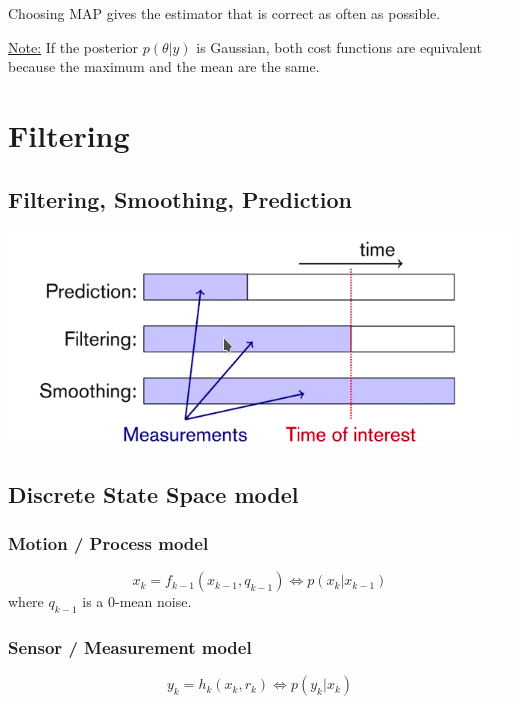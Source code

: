 Choosing MAP gives the estimator that is correct as often as possible.


\underline{Note:} If the posterior $p(\theta|y)$ is Gaussian, both cost functions are equivalent because the maximum and the mean are the same.

\section{Filtering}

\subsection{Filtering, Smoothing, Prediction}
\includegraphics[scale=0.5]{content/prediction_filtering_smoothing.png}

\subsection{Discrete State Space model}
\subsubsection{Motion / Process model}
\begin{equation}
    x_k = f_{k-1}(x_{k-1}, q_{k-1}) \Leftrightarrow p(x_k | x_{k-1}) 
\end{equation}
where $q_{k-1}$ is a 0-mean noise.

\subsubsection{Sensor / Measurement model}
\begin{equation}
    y_k = h_k(x_k, r_k) \Leftrightarrow p(y_k | x_k)
\end{equation}

